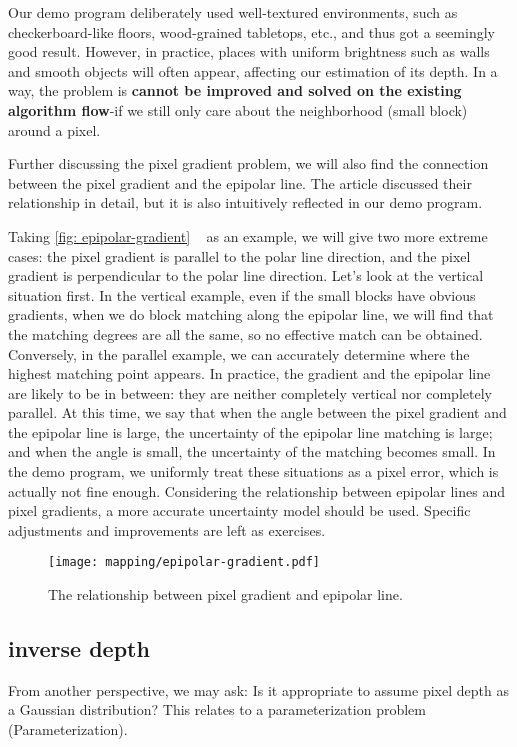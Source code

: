 Our demo program deliberately used well-textured environments, such as checkerboard-like floors, wood-grained tabletops, etc., and thus got a seemingly good result. However, in practice, places with uniform brightness such as walls and smooth objects will often appear, affecting our estimation of its depth. In a way, the problem is \textbf{cannot be improved and solved on the existing algorithm flow}-if we still only care about the neighborhood (small block) around a pixel.

Further discussing the pixel gradient problem, we will also find the connection between the pixel gradient and the epipolar line. The article \cite{Engel2013} discussed their relationship in detail, but it is also intuitively reflected in our demo program.

Taking \autoref{fig: epipolar-gradient} ~ as an example, we will give two more extreme cases: the pixel gradient is parallel to the polar line direction, and the pixel gradient is perpendicular to the polar line direction. Let's look at the vertical situation first. In the vertical example, even if the small blocks have obvious gradients, when we do block matching along the epipolar line, we will find that the matching degrees are all the same, so no effective match can be obtained. Conversely, in the parallel example, we can accurately determine where the highest matching point appears. In practice, the gradient and the epipolar line are likely to be in between: they are neither completely vertical nor completely parallel. At this time, we say that when the angle between the pixel gradient and the epipolar line is large, the uncertainty of the epipolar line matching is large; and when the angle is small, the uncertainty of the matching becomes small. In the demo program, we uniformly treat these situations as a pixel error, which is actually not fine enough. Considering the relationship between epipolar lines and pixel gradients, a more accurate uncertainty model should be used. Specific adjustments and improvements are left as exercises.

\begin{figure}[! htp]
\centering
\texttt{[image: mapping/epipolar-gradient.pdf]}
\caption{The relationship between pixel gradient and epipolar line. }
\label{fig: epipolar-gradient}
\end{figure}

\subsection{inverse depth}
From another perspective, we may ask: Is it appropriate to assume pixel depth as a Gaussian distribution? This relates to a parameterization problem (Parameterization).

